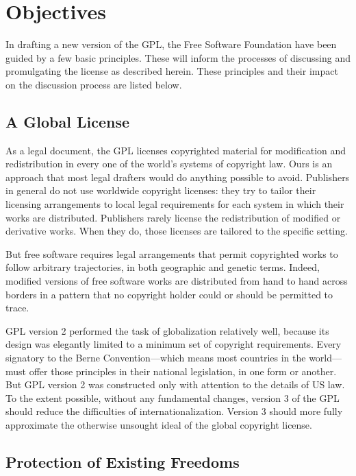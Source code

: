 \chapter{Objectives}


In drafting a new version of the GPL, the Free Software Foundation have
been guided by a few basic principles. These will inform the processes
of discussing and promulgating the license as described herein. These
principles and their impact on the discussion process are listed below.

\section{A Global License}

As a legal document, the GPL licenses copyrighted material for
modification and redistribution in every one of the world's systems of
copyright law.
Ours is an approach that most legal drafters would do anything possible
to avoid. Publishers in general do not use worldwide copyright licenses:
they try to tailor their licensing arrangements to local legal requirements
for each system in which their works are distributed. Publishers rarely
license the redistribution of modified or derivative works. When they do,
those licenses are tailored to the specific setting.

But free software requires legal arrangements that permit copyrighted
works to follow arbitrary trajectories, in both geographic and genetic terms.
Indeed, modified versions of free software works are distributed from hand
to hand across borders in a pattern that no copyright holder could or should
be permitted to trace.

GPL version 2 performed the task of globalization relatively well, because
its design was elegantly limited to a minimum set of copyright requirements.
Every signatory to the Berne Convention---which means most
countries in the world---must offer those principles in their national
legislation, in one form or another. But GPL version 2 was constructed only
with attention to the details of US law. To the extent possible, without any
fundamental changes, version 3 of the GPL should reduce the difficulties
of internationalization. Version 3 should more fully approximate the
otherwise unsought ideal of the global copyright license.

\section{Protection of Existing Freedoms}


